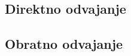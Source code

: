 \documentclass{article}
\begin{document}
\subsection{Direktno odvajanje}
\subsection{Obratno odvajanje}
\end{document}

